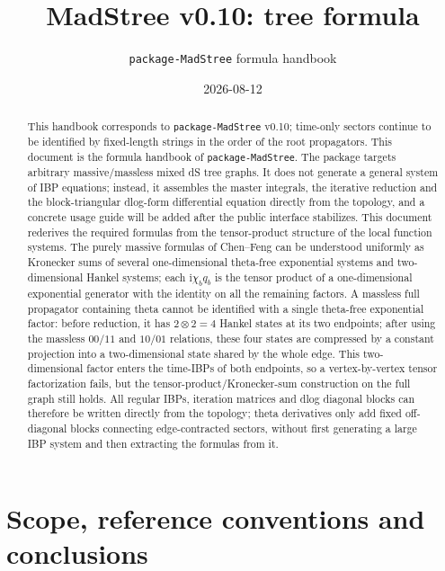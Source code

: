\documentclass[11pt,a4paper]{article}
\title{MadStree v0.10: tree formula}
\author{\texttt{package-MadStree} formula handbook}
\date{2026-08-12}
\newcommand{\ii}{\mathrm i}
\begin{document}
\maketitle

\begin{abstract}
This handbook corresponds to \texttt{package-MadStree} v0.10; time-only sectors continue to be identified by fixed-length strings in the order of the root propagators.
This document is the formula handbook of \texttt{package-MadStree}. The package targets arbitrary massive/massless mixed dS tree graphs. It does not generate a general system of IBP equations; instead, it assembles the master integrals, the iterative reduction and the block-triangular dlog-form differential equation directly from the topology, and a concrete usage guide will be added after the public interface stabilizes. This document rederives the required formulas from the tensor-product structure of the local function systems. The purely massive formulas of Chen--Feng can be understood uniformly as Kronecker sums of several one-dimensional theta-free exponential systems and two-dimensional Hankel systems; each $\ii\chi_bq_b$ is the tensor product of a one-dimensional exponential generator with the identity on all the remaining factors. A massless full propagator containing theta cannot be identified with a single theta-free exponential factor: before reduction, it has $2\otimes2=4$ Hankel states at its two endpoints; after using the massless $00/11$ and $10/01$ relations, these four states are compressed by a constant projection into a two-dimensional state shared by the whole edge. This two-dimensional factor enters the time-IBPs of both endpoints, so a vertex-by-vertex tensor factorization fails, but the tensor-product/Kronecker-sum construction on the full graph still holds. All regular IBPs, iteration matrices and dlog diagonal blocks can therefore be written directly from the topology; theta derivatives only add fixed off-diagonal blocks connecting edge-contracted sectors, without first generating a large IBP system and then extracting the formulas from it.
\end{abstract}

\tableofcontents

\section{Scope, reference conventions and conclusions}
\end{document}

